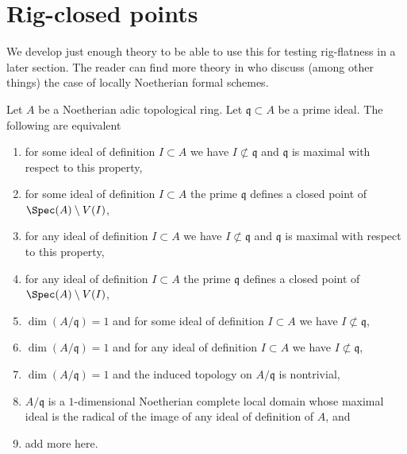 \section{Rig-closed points}
\label{section-rig-points}

\noindent
We develop just enough theory to be able to use this for testing
rig-flatness in a later section. The reader can find more theory
in \cite{BL-I} who discuss (among other things) the
case of locally Noetherian formal schemes.

\begin{lemma}
\label{lemma-rig-point}
Let $A$ be a Noetherian adic topological ring. Let
$\mathfrak q \subset A$ be a prime ideal. The following are
equivalent
\begin{enumerate}
\item for some ideal of definition $I \subset A$ we have
$I \not \subset \mathfrak q$ and $\mathfrak q$ is maximal
with respect to this property,
\item for some ideal of definition $I \subset A$ the prime
$\mathfrak q$ defines a closed point of $\Spec(A) \setminus V(I)$,
\item for any ideal of definition $I \subset A$ we have
$I \not \subset \mathfrak q$ and $\mathfrak q$ is maximal
with respect to this property,
\item for any ideal of definition $I \subset A$ the prime
$\mathfrak q$ defines a closed point of $\Spec(A) \setminus V(I)$,
\item $\dim(A/\mathfrak q) = 1$ and for some ideal of definition
$I \subset A$ we have $I \not \subset \mathfrak q$,
\item $\dim(A/\mathfrak q) = 1$ and for any ideal of definition
$I \subset A$ we have $I \not \subset \mathfrak q$,
\item $\dim(A/\mathfrak q) = 1$ and the induced topology
on $A/\mathfrak q$ is nontrivial,
\item $A/\mathfrak q$ is a $1$-dimensional Noetherian complete local domain
whose maximal ideal is the radical of the image of any ideal of
definition of $A$, and
\item add more here.
\end{enumerate}
\end{lemma}

